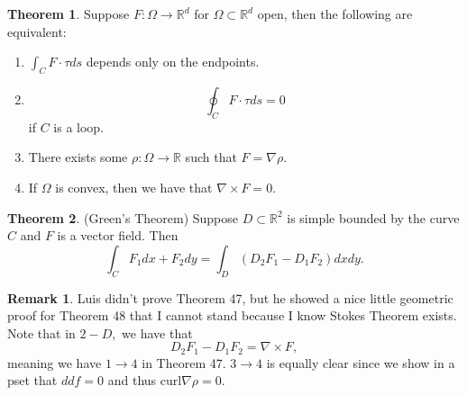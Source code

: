 \documentclass[10pt, oneside]{article}
\newcommand{\bbR}{\mathbb{R}}
\newcommand{\curl}{\text{curl}}
\theoremstyle{definition}
\newtheorem{thm}{Theorem}
\newtheorem{rem}{Remark}
\begin{document}
\begin{thm}
    Suppose $F: \Omega \to \bbR^d$ for $\Omega \subset \bbR^d$ open, then the following are equivalent:
    \begin{enumerate}
        \item $\int_C F\cdot \tau ds$ depends only on the endpoints.
        \item \[\oint_C F\cdot \tau ds = 0\] if $C$ is a loop.
        \item There exists some $\rho: \Omega \to \bbR$ such that $F = \nabla \rho.$
        \item If $\Omega$ is convex, then we have that 
        $\nabla \times F = 0.$ 
    \end{enumerate}
\end{thm}
\begin{thm}
(Green's Theorem) Suppose $D\subset \bbR^2$ is simple bounded by the curve $C$ and $F$ is a vector field. Then 
\[\int_C F_1dx + F_2dy = \int_D (D_2F_1 - D_1F_2)dxdy .\]
\end{thm}
\begin{rem}
    Luis didn't prove Theorem 47, but he showed a nice little geometric proof for Theorem 48 that I cannot stand because I know Stokes Theorem exists. Note that in $2-D,$ we have that 
    \[D_2F_1 - D_1F_2 = \nabla \times F,\] meaning we have $1\to 4$ in Theorem 47. $3\to 4$ is equally clear since we show in a pset that $ddf = 0$ and thus $\curl \nabla \rho = 0.$
\end{rem}
\end{document}
